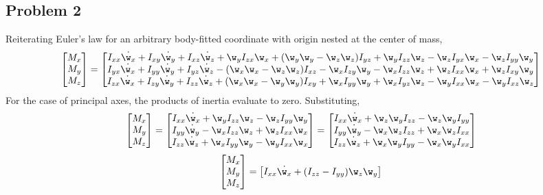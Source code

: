 \documentclass[a4paper, 12pt]{report}
\begin{document}
\begin{center}
\section{Problem 2}
\begin{comment}
\end{comment}
Reiterating Euler's law for an arbitrary body-fitted coordinate with origin nested at the center of mass,
$$\begin{bmatrix}M_x \\ M_y \\ M_z\end{bmatrix} = 
\begin{bmatrix} 
I_{xx}\dot{\w_x} + I_{xy}\dot{\w_y} + I_{xz}\dot{\w_z}  + \w_yI_{zx}\w_x + (\w_y\w_y - \w_z\w_z)I_{yz} + \w_yI_{zz}\w_z - \w_zI_{yx}\w_x - \w_zI_{yy}\w_y\\
I_{yx}\dot{\w_x} + I_{yy}\dot{\w_y} + I_{yz}\dot{\w_z} - (\w_x\w_x - \w_z\w_z)I_{xz} - \w_xI_{zy}\w_y - \w_xI_{zz}\w_z + \w_zI_{xx}\w_x + \w_zI_{xy}\w_y\\
I_{zx}\dot{\w_x} + I_{zy}\dot{\w_y} + I_{zz}\dot{\w_z} + (\w_x\w_x - \w_y\w_y)I_{xy} + \w_xI_{yy}\w_y + \w_xI_{yz}\w_z - \w_yI_{xx}\w_x  - \w_yI_{xz}\w_z
\end{bmatrix}$$
For the case of principal axes, the products of inertia evaluate to zero. Substituting,
$$\begin{bmatrix}M_x \\ M_y \\ M_z\end{bmatrix} = 
\begin{bmatrix} 
I_{xx}\dot{\w_x} + \w_yI_{zz}\w_z - \w_zI_{yy}\w_y\\
I_{yy}\dot{\w_y} - \w_xI_{zz}\w_z + \w_zI_{xx}\w_x\\
I_{zz}\dot{\w_z} + \w_xI_{yy}\w_y - \w_yI_{xx}\w_x
\end{bmatrix} = \begin{bmatrix} 
I_{xx}\dot{\w_x} + \w_z\w_yI_{zz} - \w_z\w_yI_{yy}\\
I_{yy}\dot{\w_y} - \w_x\w_zI_{zz} + \w_x\w_zI_{xx}\\
I_{zz}\dot{\w_z} + \w_x\w_yI_{yy} - \w_x\w_yI_{xx}
\end{bmatrix}$$
$$\begin{bmatrix}M_x \\ M_y \\ M_z\end{bmatrix} = 
\begin{bmatrix} 
I_{xx}\dot{\w_x} + (I_{zz} - I_{yy})\w_z\w_y\\

\end{bmatrix}$$
\end{center}
\end{document}

